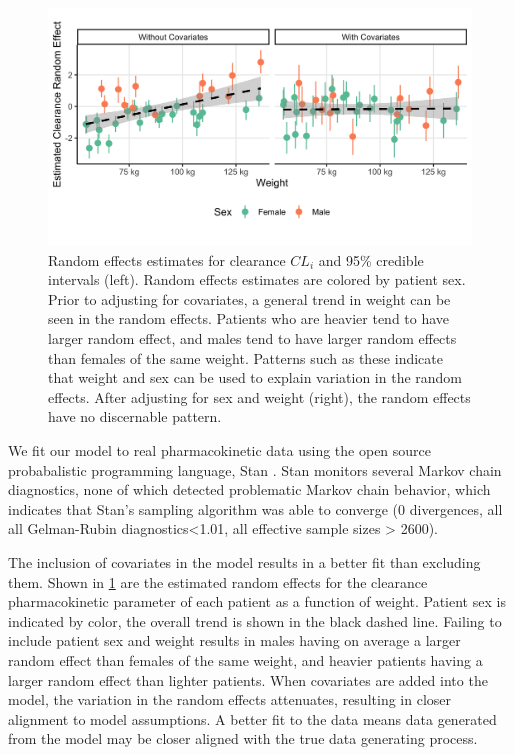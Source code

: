 \begin{figure}
	\centering
	\includegraphics[width=\linewidth]{figures/random_effects_change.png}
	\caption{Random effects estimates for clearance $ CL_i $ and 95\% credible intervals (left).  Random effects estimates are colored by patient sex.  Prior to adjusting for covariates, a general trend in weight can be seen in the random effects.  Patients who are heavier tend to have larger random effect, and males tend to have larger random effects than females of the same weight.  Patterns such as these indicate that weight and sex can be used to explain variation in the random effects.  After adjusting for sex and weight (right), the random effects have no discernable pattern.}
	\label{fig:randomeffectschange}
\end{figure}

We fit our model to real pharmacokinetic data using the open source probabalistic programming language, Stan \cite{gelman2015stan}.  Stan monitors several Markov chain diagnostics, none of which detected problematic Markov chain behavior, which indicates that Stan’s sampling algorithm was able to converge (0 divergences, all all Gelman-Rubin diagnostics<1.01, all effective sample sizes  > 2600).  

The inclusion of covariates in the model results in a better fit than excluding them. Shown in \cref{fig:randomeffectschange} are the estimated random effects for the clearance pharmacokinetic parameter of each patient as a function of weight.  Patient sex is indicated by color, the overall trend is shown in the black dashed line.  Failing to include patient sex and weight results in males having on average a larger random effect than females of the same weight, and heavier patients having a larger random effect than lighter patients.  When covariates are added into the model, the variation in the random effects attenuates, resulting in closer alignment to model assumptions. A better fit to the data means data generated from the model may be closer aligned with the true data generating process.

